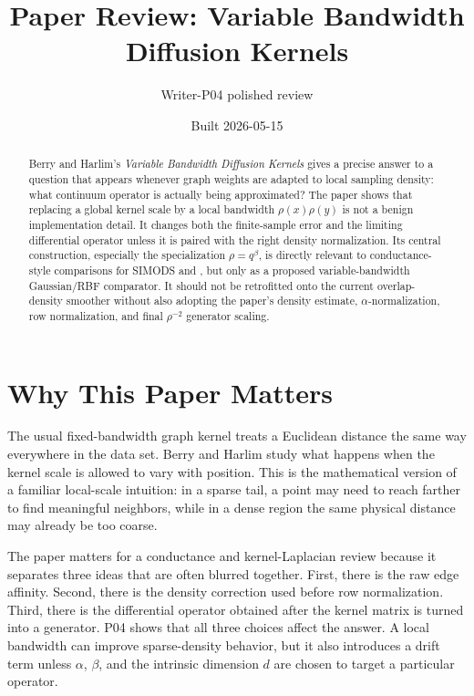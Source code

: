 \documentclass[11pt]{article}
\title{Paper Review: Variable Bandwidth Diffusion Kernels}
\author{Writer-P04 polished review}
\date{Built 2026-05-15}
\begin{document}
\maketitle

\begin{abstract}
Berry and Harlim's \emph{Variable Bandwidth Diffusion Kernels}
\citep{berry2016variable} gives a precise answer to a question that appears
whenever graph weights are adapted to local sampling density: what continuum
operator is actually being approximated?  The paper shows that replacing a
global kernel scale by a local bandwidth \(\rho(x)\rho(y)\) is not a benign
implementation detail.  It changes both the finite-sample error and the
limiting differential operator unless it is paired with the right density
normalization.  Its central construction, especially the specialization
\(\rho=q^\beta\), is directly relevant to conductance-style comparisons for
SIMODS and , but only as a proposed variable-bandwidth
Gaussian/RBF comparator.  It should not be retrofitted onto the current
overlap-density smoother without also adopting the paper's density estimate,
\(\alpha\)-normalization, row normalization, and final \(\rho^{-2}\) generator
scaling.
\end{abstract}

\section{Why This Paper Matters}

The usual fixed-bandwidth graph kernel treats a Euclidean distance the same
way everywhere in the data set.  Berry and Harlim study what happens when the
kernel scale is allowed to vary with position.  This is the mathematical
version of a familiar local-scale intuition: in a sparse tail, a point may need
to reach farther to find meaningful neighbors, while in a dense region the same
physical distance may already be too coarse.

The paper matters for a conductance and kernel-Laplacian review because it
separates three ideas that are often blurred together.  First, there is the raw
edge affinity.  Second, there is the density correction used before row
normalization.  Third, there is the differential operator obtained after the
kernel matrix is turned into a generator.  P04 shows that all three choices
affect the answer.  A local bandwidth can improve sparse-density behavior, but
it also introduces a drift term unless \(\alpha\), \(\beta\), and the intrinsic
dimension \(d\) are chosen to target a particular operator.
\end{document}
